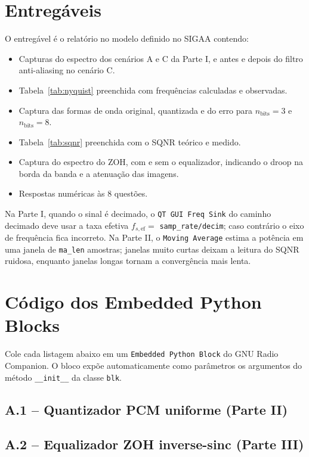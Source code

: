 \documentclass[11pt,a4paper]{article}
\begin{document}
\section{Entregáveis}

O entregável é o relatório no modelo definido no SIGAA contendo:

\begin{itemize}
  \item Capturas do espectro dos cenários A e C da Parte I, e antes e
    depois do filtro anti-aliasing no cenário C.
  \item Tabela~\ref{tab:nyquist} preenchida com frequências calculadas e
    observadas.
  \item Captura das formas de onda original, quantizada e do erro para
    $n_\text{bits} = 3$ e $n_\text{bits} = 8$.
  \item Tabela~\ref{tab:sqnr} preenchida com o SQNR teórico e medido.
  \item Captura do espectro do ZOH, com e sem o equalizador, indicando o
    droop na borda da banda e a atenuação das imagens.
  \item Respostas numéricas às 8 questões.
\end{itemize}

\begin{atencao}
Na Parte I, quando o sinal é decimado, o \texttt{QT GUI Freq Sink} do
caminho decimado deve usar a taxa efetiva $f_{s,\text{ef}} = $
\texttt{samp\_rate/decim}; caso contrário o eixo de frequência fica
incorreto. Na Parte II, o \texttt{Moving Average} estima a potência em uma
janela de \texttt{ma\_len} amostras; janelas muito curtas deixam a leitura
do SQNR ruidosa, enquanto janelas longas tornam a convergência mais lenta.
\end{atencao}

\appendix
\section{Código dos Embedded Python Blocks}
\label{ap:codigos}

Cole cada listagem abaixo em um \texttt{Embedded Python Block} do GNU Radio
Companion. O bloco expõe automaticamente como parâmetros os argumentos do
método \texttt{\_\_init\_\_} da classe \texttt{blk}.

\subsection*{A.1 -- Quantizador PCM uniforme (Parte II)}



\subsection*{A.2 -- Equalizador ZOH inverse-sinc (Parte III)}


\end{document}
